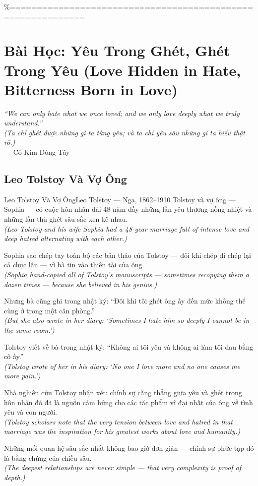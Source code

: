 \%============================================================
\chapter{Bài Học: Yêu Trong Ghét, Ghét Trong Yêu (Love Hidden in Hate, Bitterness Born in Love)}
\begin{center}
  \textit{\color{truyengold}``We can only hate what we once loved; and we only love deeply what we truly understand.''}\\[4pt]
  \textit{(Ta chỉ ghét được những gì ta từng yêu; và ta chỉ yêu sâu những gì ta hiểu thật rõ.)}\\[4pt]
  \small\color{truyenblue}--- Cổ Kim Đông Tây ---
\end{center}
\ngancach

\section{Leo Tolstoy Và Vợ Ông}
\begin{truyen}{Leo Tolstoy Và Vợ Ông}{Leo Tolstoy --- Nga, 1862--1910}
 Tolstoy và vợ ông --- Sophia --- có cuộc hôn nhân dài 48 năm đầy những lần yêu thương nồng nhiệt và những lần thù ghét sâu sắc xen kẽ nhau.\\[4pt]
\textit{(Leo Tolstoy and his wife Sophia had a 48-year marriage full of intense love and deep hatred alternating with each other.)}

Sophia sao chép tay toàn bộ các bản thảo của Tolstoy --- đôi khi chép đi chép lại cả chục lần --- vì bà tin vào thiên tài của ông.\\[4pt]
\textit{(Sophia hand-copied all of Tolstoy's manuscripts --- sometimes recopying them a dozen times --- because she believed in his genius.)}

Nhưng bà cũng ghi trong nhật ký: ``Đôi khi tôi ghét ông ấy đến mức không thể cùng ở trong một căn phòng.''\\[4pt]
\textit{(But she also wrote in her diary: `Sometimes I hate him so deeply I cannot be in the same room.')}

Tolstoy viết về bà trong nhật ký: ``Không ai tôi yêu và không ai làm tôi đau bằng cô ấy.''\\[4pt]
\textit{(Tolstoy wrote of her in his diary: `No one I love more and no one causes me more pain.')}

Nhà nghiên cứu Tolstoy nhận xét: chính sự căng thẳng giữa yêu và ghét trong hôn nhân đó đã là nguồn cảm hứng cho các tác phẩm vĩ đại nhất của ông về tình yêu và con người.\\[4pt]
\textit{(Tolstoy scholars note that the very tension between love and hatred in that marriage was the inspiration for his greatest works about love and humanity.)}

\end{truyen}
\begin{baihoc}
  Những mối quan hệ sâu sắc nhất không bao giờ đơn giản --- chính sự phức tạp đó là bằng chứng của chiều sâu.\\[4pt]
  \textit{(The deepest relationships are never simple --- that very complexity is proof of depth.)}
\end{baihoc}


